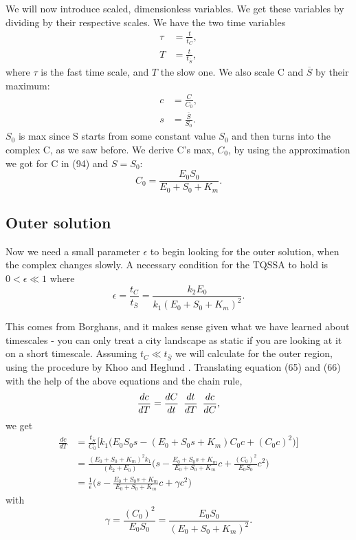 \documentclass[12pt]{article}
\begin{document}
We will now introduce scaled, dimensionless variables. We get these
variables by dividing by their respective scales. We have the two time
variables
\begin{align}
\tau &= \frac{t}{t_C}, \\
T &= \frac{t}{t_{\overline{S}}},
\end{align}
where $\tau$ is the fast time scale, and $T$ the slow one. We also
scale C and $\overline{S}$ by their maximum:
\begin{align}
c &= \frac{C}{C_0}, \\
s &= \frac{\overline{S}}{S_0}.
\end{align}
$S_0$ is max since S starts from some constant value $S_0$ and then
turns into the complex C, as we saw before. We derive C's max, $C_0$,
by using the approximation we got for C in (94) and $S=S_0$:
\begin{equation}
C_0 = \frac{E_0 S_0}{E_0 + S_0 + K_m}.
\end{equation}

\subsection{Outer solution}

Now we need a small parameter $\epsilon$ to begin looking for the
outer solution, when the complex changes slowly. A necessary condition
for the TQSSA to hold is $0 < \epsilon \ll 1$ where
\begin{equation}
\epsilon = \frac{t_C}{t_{\overline{S}}} = \frac{k_2 E_0}{k_1(E_0+S_0+K_m)^2}.
\end{equation}

This comes from Borghans, and it makes sense given what we have
learned about timescales - you can only treat a city landscape as
static if you are looking at it on a short timescale. Assuming
$t_C \ll t_{\overline{S}}$ we will calculate for the outer region,
using the procedure by Khoo and Heglund
\cite{khoo2008total}. Translating equation (65) and (66) with the help
of the above equations and the chain rule,
\begin{equation}
\frac{dc}{dT} = \frac{dC}{dt} \enskip \frac{dt}{dT} \enskip \frac{dc}{dC},
\end{equation}
we get
\begin{align}
\frac{dc}{dT} &= \frac{t_{\overline{S}}}{C_0}
       \Big[k_1 \Big(E_0 S_0 s - (E_0 + S_0 s + K_m) C_0 c + (C_0 c)^2
                   \Big)\Big] \\
              &= \frac{(E_0+S_0+K_m)^2 k_1}{(k_2 + E_0)}
                 \Big(s - \frac{E_0+S_0 s+K_m}{E_0 + S_0 + K_m} c
                        + \frac{(C_0)^2}{E_0 S_0} c^2 \Big) \\
              &= \frac{1}{\epsilon}
                 \Big(s - \frac{E_0+S_0 s+K_m}{E_0 + S_0 + K_m} c
                        +  \gamma c^2 \Big)
\end{align}
with
\begin{equation}
\gamma = \frac{(C_0)^2}{E_0 S_0} = \frac{E_0 S_0}{(E_0 + S_0 + K_m)^2}.
\end{equation}
\end{document}
